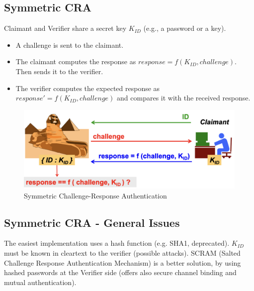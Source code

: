 \subsection{Symmetric CRA}
Claimant and Verifier share a secret key \(K_{ID}\) (e.g., a password or a key).


\begin{multicols}{2}

    \begin{itemize}
        \item A challenge is sent to the claimant.
        \item The claimant computes the response as \(response = f(K_{ID}, challenge)\). Then sends it to the verifier.
        \item The verifier computes the expected response as \(response' = f(K_{ID}, challenge)\) and compares it with the received response.
    \end{itemize}
    
\columnbreak

    \begin{figure}[H]
        \centering
        \includegraphics[width=\linewidth]{Images/Authentication/symCRA.png}
        \caption{Symmetric Challenge-Response Authentication}
    \end{figure}
\end{multicols}

\subsection*{Symmetric CRA - General Issues}
The easiest implementation uses a hash function (e.g. SHA1, deprecated). $K_{ID}$ must be known in cleartext to the verifier (possible attacks). SCRAM (Salted Challenge Response Authentication Mechanism) is a better solution, by using hashed passwords at the Verifier side (offers also secure channel binding and mutual authentication).

\clearpage
